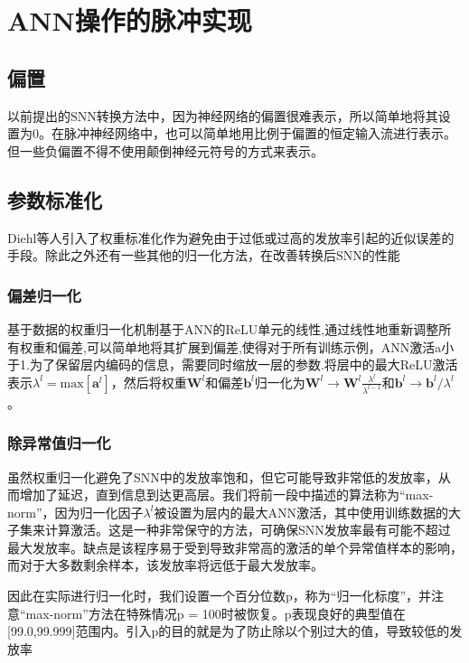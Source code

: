 \section{ANN操作的脉冲实现}
\subsection{偏置}
\par
以前提出的SNN转换方法中，因为神经网络的偏置很难表示，所以简单地将其设置为0。在脉冲神经网络中，也可以简单地用比例于偏置的恒定输入流进行表示。 但一些负偏置不得不使用颠倒神经元符号的方式来表示。
\subsection{参数标准化}
\par
Diehl等人引入了权重标准化作为避免由于过低或过高的发放率引起的近似误差的手段。除此之外还有一些其他的归一化方法，在改善转换后SNN的性能
\subsubsection{偏差归一化}
\par
基于数据的权重归一化机制基于ANN的ReLU单元的线性,通过线性地重新调整所有权重和偏差,可以简单地将其扩展到偏差,使得对于所有训练示例，ANN激活a小于1.为了保留层内编码的信息，需要同时缩放一层的参数.将层中的最大ReLU激活表示$\lambda^l=\text{max}[\mathbf{a}^l]$，然后将权重$\mathbf{W}^l$和偏差$\mathbf{b}^l$归一化为$\mathbf{W}^l \to \mathbf{W}^l \frac{\lambda^l}{\lambda^{l-1}}$和$\mathbf{b}^l \to \mathbf{b}^l / \lambda^l$。 

\subsubsection{除异常值归一化}
\par
虽然权重归一化避免了SNN中的发放率饱和，但它可能导致非常低的发放率，从而增加了延迟，直到信息到达更高层。我们将前一段中描述的算法称为“max-norm”，因为归一化因子$\lambda^l$被设置为层内的最大ANN激活，其中使用训练数据的大子集来计算激活。这是一种非常保守的方法，可确保SNN发放率最有可能不超过最大发放率。缺点是该程序易于受到导致非常高的激活的单个异常值样本的影响，而对于大多数剩余样本，该发放率将远低于最大发放率。
\par
因此在实际进行归一化时，我们设置一个百分位数p，称为“归一化标度”，并注意“max-norm”方法在特殊情况p = 100时被恢复。p表现良好的典型值在[99.0,99.999]范围内。引入p的目的就是为了防止除以个别过大的值，导致较低的发放率
